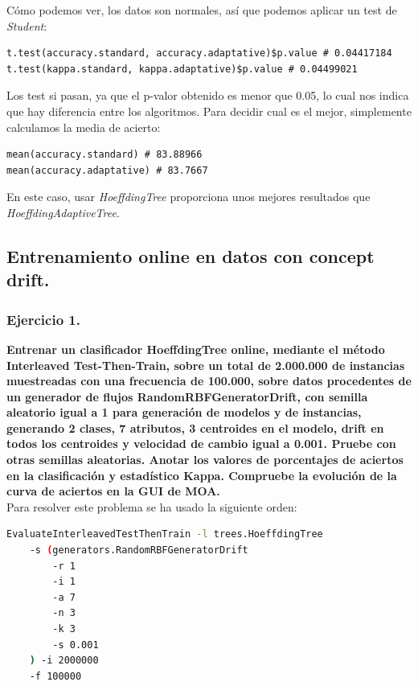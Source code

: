 \documentclass[11pt]{article}
\begin{document}
Cómo podemos ver, los datos son normales, así que podemos aplicar un test de \textit{Student}:

\begin{lstlisting}
t.test(accuracy.standard, accuracy.adaptative)$p.value # 0.04417184
t.test(kappa.standard, kappa.adaptative)$p.value # 0.04499021
\end{lstlisting}

Los test si pasan, ya que el p-valor obtenido es menor que 0.05, lo cual nos indica que hay diferencia entre los algoritmos. Para decidir cual es el mejor, simplemente calculamos la media de acierto:

\begin{lstlisting}
mean(accuracy.standard) # 83.88966
mean(accuracy.adaptative) # 83.7667
\end{lstlisting}

En este caso, usar \textit{HoeffdingTree} proporciona unos mejores resultados que \textit{HoeffdingAdaptiveTree}.

\subsection{Entrenamiento online en datos con concept drift.}

\subsubsection{Ejercicio 1.}

\textbf{Entrenar un clasificador HoeffdingTree online, mediante el método Interleaved Test-Then-Train, sobre un total de 2.000.000 de instancias muestreadas con una frecuencia de 100.000, sobre datos procedentes de un generador de flujos RandomRBFGeneratorDrift, con semilla aleatorio igual a 1 para generación de modelos y de instancias, generando 2 clases, 7 atributos, 3 centroides en el modelo, drift en todos los centroides y velocidad de cambio igual a 0.001. Pruebe con otras semillas aleatorias. Anotar los valores de porcentajes de aciertos en la clasificación y estadístico Kappa. Compruebe la evolución de la curva de aciertos en la GUI de MOA.} \\

Para resolver este problema se ha usado la siguiente orden:

\begin{lstlisting}[language=bash]
EvaluateInterleavedTestThenTrain -l trees.HoeffdingTree
	-s (generators.RandomRBFGeneratorDrift 
		-r 1 
		-i 1 
		-a 7 
		-n 3
		-k 3 
		-s 0.001 
	) -i 2000000
	-f 100000
\end{lstlisting}
\end{document}
